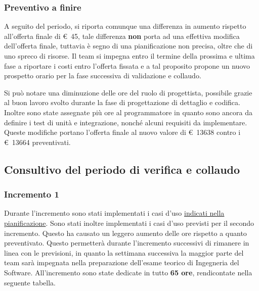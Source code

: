         \subsubsection{Preventivo a finire}
            A seguito del periodo, si riporta comunque una differenza in aumento rispetto all'offerta finale di \euro\ 45,
            tale differenza \textbf{non} porta ad una effettiva modifica dell'offerta finale, tuttavia è segno di una pianificazione non precisa,
            oltre che di uno spreco di risorse.
            Il team si impegna entro il termine della prossima e ultima fase a riportare i costi entro l'offerta fissata e a tal proposito propone
            un nuovo prospetto orario per la fase successiva di validazione e collaudo.
            \def\salarycontent{
                {Amministratore,16,20,320},
                {Analista,0,25,0},
                {Progettista,$48-\noexpand\textbf{8}$,22,880},
                {Programmatore,$43+\noexpand\textbf{7}$,15,750},
                {Responsabile,15,30,450},
                {Verificatore,60,15,900},
                {Totale,181,127,$3371-\noexpand\textbf{71} = 3300 $ },
            }
            
            \label{table:nuovo_orario_verifica}
            Si può notare una diminuzione delle ore del ruolo di progettista, possibile grazie
            al buon lavoro svolto durante la fase di progettazione di dettaglio e codifica.
            Inoltre sono state assegnate più ore al programmatore in quanto sono ancora da definire
            i test di unità e integrazione, nonché alcuni requisiti da implementare. \\
            \noindent Queste modifiche portano l'offerta finale al nuovo valore di \euro\ 13638 contro
            i \euro\ 13664 preventivati.
\subsection{Consultivo del periodo di verifica e collaudo}
    \subsubsection{Incremento 1}
        Durante l'incremento sono stati implementati i casi d'uso \hyperref[table:pianificazione_verifica]{indicati nella pianificazione}. Sono stati inoltre implementati i casi d'uso previsti per il secondo incremento. Questo ha causato un leggero aumento delle ore rispetto a quanto preventivato. Questo permetterà durante l'incremento successivi di rimanere in linea con le previsioni, in quanto la settimana successiva la maggior parte del team sarà impegnata nella preparazione dell'esame teorico di Ingegneria del Software. All'incremento sono state dedicate in tutto \textbf{65 ore}, rendicontate nella seguente tabella.
        \def\salarycontent{
            {Amministratore,4,20,80},
            {Analista,      0,25,0},
            {Progettista,   10,22,220},
            {Programmatore, 38,15,570},
            {Responsabile,  3,30,90},
            {Verificatore,  10,15,150},
            {Totale,        65,127, 1110},
        }
        
